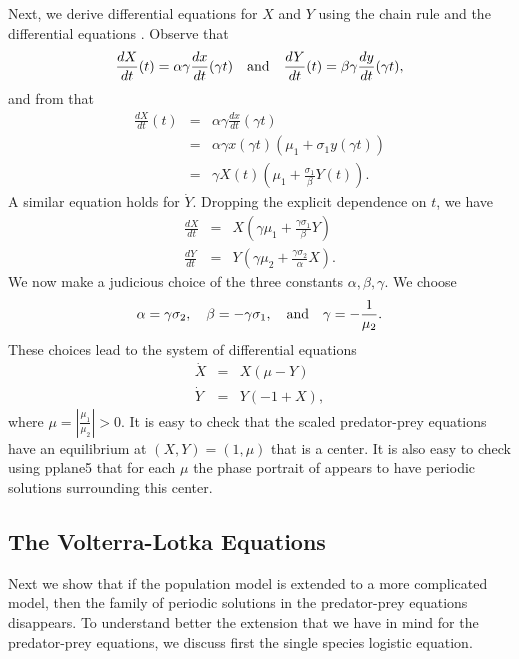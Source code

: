 \documentclass{ximera}
\begin{document}
Next, we derive differential equations for $X$ and $Y$ using the
chain rule and the differential 
equations . Observe that 
\[
\frac{dX}{dt}(t) = \alpha \gamma \frac{dx}{dt}(\gamma t) \quad\mbox{and}\quad  
\frac{dY}{dt}(t) = \beta \gamma \frac{dy}{dt}(\gamma t),
\]
and from  that 
\begin{eqnarray*}
\frac{dX}{dt}(t) & = & \alpha \gamma \frac{dx}{dt}(\gamma t) \\
& = & \alpha \gamma x(\gamma t)(\mu_1 + \sigma_1y(\gamma t)) \\
& = & \gamma X(t)(\mu_1 + \frac{\sigma_1}{\beta}Y(t)).
\end{eqnarray*}
A similar equation holds for $\dot{Y}$.  Dropping the explicit 
dependence on $t$, we have
\begin{eqnarray*}
\frac{dX}{dt} & = & X(\gamma \mu_1 + \frac{\gamma\sigma_1}{\beta}Y)\\
\frac{dY}{dt} & = & Y(\gamma \mu_2 + \frac{\gamma\sigma_2}{\alpha}X).
\end{eqnarray*}
We now make a judicious choice of the three constants $\alpha,\beta,
\gamma$.  We choose
\begin{equation}  \label{E:scalingcoeff}
\alpha = \gamma\sigma_2, \quad \beta = -\gamma\sigma_1, \quad\mbox{and}\quad
\gamma = -\frac{1}{\mu_2}.
\end{equation}
These choices lead to the system of differential equations
\begin{equation*}  \label{e:PP2}
\begin{array}{lcl}
\dot{X} & = & X(\mu - Y) \\
\dot{Y} & = & Y(-1 + X),
\end{array}
\end{equation*}%
where $\mu = \left|\frac{\mu_1}{\mu_2}\right|>0$.  It is easy to 
check that the scaled predator-prey equations  have 
an equilibrium at $(X,Y)=(1,\mu)$ that is a center.  It is also 
easy to check using {\sf pplane5} that for each $\mu$ the phase 
portrait of  appears to have periodic solutions 
surrounding this center.

\subsection*{The Volterra-Lotka Equations}

Next we show that if the population model  is extended to 
a more complicated model, then the family of periodic 
solutions in 
the predator-prey equations disappears.  To understand better the 
extension that we have in mind for the predator-prey equations, we 
discuss first the single species logistic equation.
 
\end{document}
